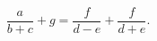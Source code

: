 \documentclass[a4paper]{article}
\title{}
\begin{document}
	\maketitle
\[
\frac{a}{b+c}+g= \frac{f}{d-e}+ \frac{f}{d+e}
.\] 
\end{document}
